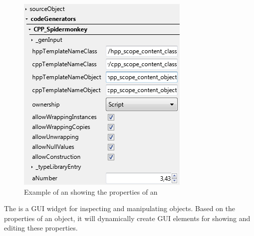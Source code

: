 \begin{figure}
  \vspace{-20pt}
  \begin{center}
    \includegraphics[scale=0.60]{Images/ObjectExplorer.png}
  \end{center}
  \caption{Example of an  showing the properties of an }
  \label{fig:ObjectExplorer}
  \vspace{-15pt}
\end{figure}

The  is a GUI widget for inspecting and manipulating  objects. Based on the properties of an object, it will dynamically create GUI elements for showing and editing these properties.

